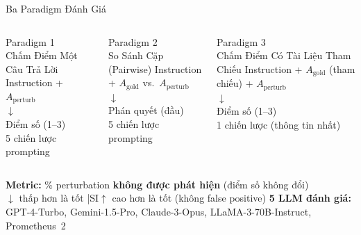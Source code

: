 \documentclass[aspectratio=169,10pt]{beamer}
\begin{document}
\begin{frame}{Ba Paradigm Đánh Giá}
  \begin{columns}[T]
      \begin{block}{Paradigm 1\\Chấm Điểm Một Câu Trả Lời}
        \centering
        \vspace{0.3em}
        Instruction + $A_{\text{perturb}}$\\
        $\downarrow$\\
        Điểm số (1–3)\\
        \vspace{0.3em}
        \small 5 chiến lược prompting
      \end{block}

      \begin{block}{Paradigm 2\\So Sánh Cặp (Pairwise)}
        \centering
        \vspace{0.3em}
        Instruction + $A_{\text{gold}}$ vs.\ $A_{\text{perturb}}$\\
        $\downarrow$\\
        Phán quyết (đầu)\\
        \vspace{0.3em}
        \small 5 chiến lược prompting
      \end{block}

      \begin{block}{Paradigm 3\\Chấm Điểm Có Tài Liệu Tham Chiếu}
        \centering
        \vspace{0.3em}
        Instruction + $A_{\text{gold}}$ (tham chiếu) + $A_{\text{perturb}}$\\
        $\downarrow$\\
        Điểm số (1–3)\\
        \vspace{0.3em}
        \small 1 chiến lược (thông tin nhất)
      \end{block}
  \end{columns}

  \vspace{0.7em}
  \begin{columns}[c]
      \textbf{Metric:} \% perturbation \textbf{không được phát hiện} (điểm số không đổi)\\
      $\downarrow$ thấp hơn là tốt \quad|\quad SI$\uparrow$ cao hơn là tốt (không false positive)
      \small\textbf{5 LLM đánh giá:} GPT-4-Turbo, Gemini-1.5-Pro, Claude-3-Opus, LLaMA-3-70B-Instruct, Prometheus~2
  \end{columns}
\end{frame}
\end{document}
